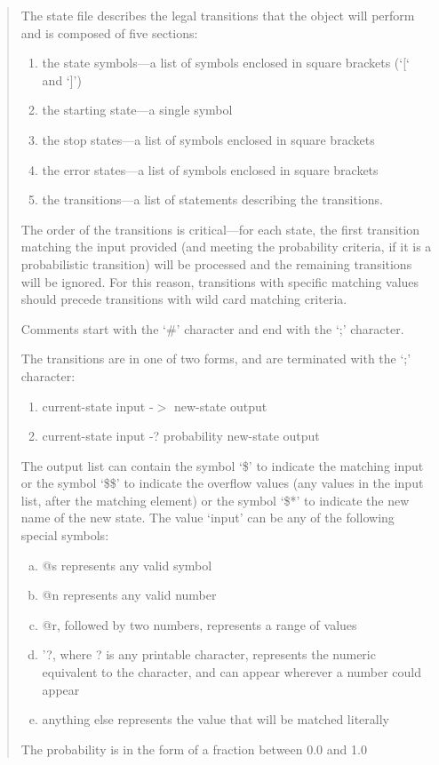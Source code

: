 \begin{quote}
The state file describes the legal transitions that the  object will perform and is
composed of five sections:
\begin{enumerate}[1)]
\item the state symbols---a list of symbols enclosed in square brackets (`[` and `]')
\item the starting state---a single symbol
\item the stop states---a list of symbols enclosed in square brackets
\item the error states---a list of symbols enclosed in square brackets
\item the transitions---a list of statements describing the transitions.
\end{enumerate}
The order of the transitions is critical---for each state, the first transition matching the
input provided (and meeting the probability criteria, if it is a probabilistic transition) will
be processed and the remaining transitions will be ignored.
For this reason, transitions with specific matching values should precede transitions with wild
card matching criteria.

Comments start with the `\#' character and end with the `;' character.

The transitions are in one of two forms, and are terminated with the `;' character:
\begin{enumerate}[5a)]
\item current-state input -$>$ new-state output
\item current-state input -? probability new-state output
\end{enumerate}
The output list can contain the symbol `\$' to indicate the matching input or the symbol `\$\$' to
indicate the overflow values (any values in the input list, after the matching element) or the
symbol `\$*' to indicate the new name of the new state.
The value `input' can be any of the following special symbols:
\begin{enumerate}[a)]
\item @s represents any valid symbol
\item @n represents any valid number
\item @r, followed by two numbers, represents a range of values
\item '?, where ? is any printable character, represents the numeric equivalent to the character,
and can appear wherever a number could appear
\item anything else represents the value that will be matched literally
\end{enumerate}
The probability is in the form of a fraction between 0.0 and 1.0
\end{quote}

